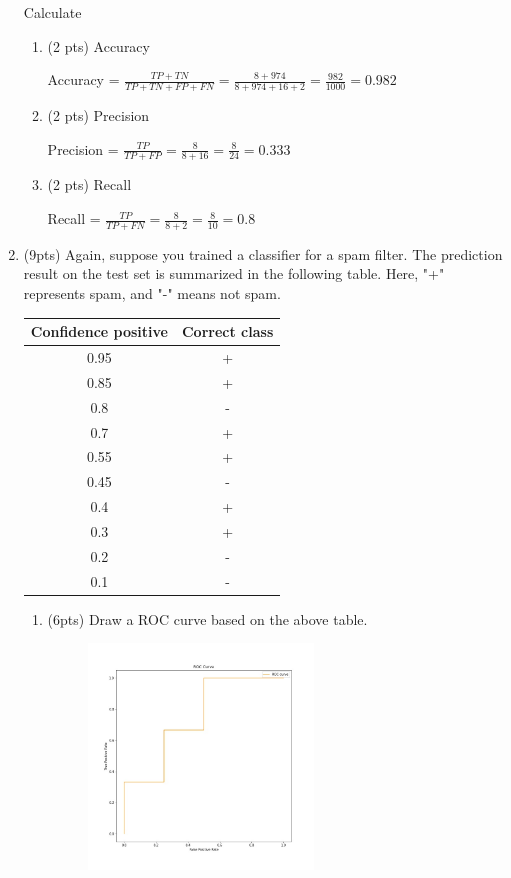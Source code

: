 \documentclass[a4paper]{article}
\theoremstyle{definition}
\newenvironment{soln}{
    \leavevmode\color{blue}\ignorespaces
}{}
\begin{document}
\begin{enumerate}
Calculate
\begin{enumerate}
	\item (2 pts) Accuracy
	\begin{soln} 
		Accuracy = $\frac{TP + TN}{TP + TN + FP + FN} = \frac{8 + 974}{8 + 974 + 16 + 2} = \frac{982}{1000} = 0.982$
	\end{soln}
	\item (2 pts) Precision
	\begin{soln} 
		Precision = $\frac{TP}{TP + FP} = \frac{8}{8 + 16} = \frac{8}{24} = 0.333$
	\end{soln}
	\item (2 pts) Recall
	\begin{soln}
		Recall = $\frac{TP}{TP + FN} = \frac{8}{8 + 2} = \frac{8}{10} = 0.8$
	\end{soln}
\end{enumerate}


\item (9pts) Again, suppose you trained a classifier for a spam filter. The prediction result on the test set is summarized in the following table. Here, "+" represents spam, and "-" means not spam.

\begin{center}
\begin{tabular}{ c  c }
\hline
Confidence positive & Correct class \\ \hline
0.95 & + \\
0.85 & + \\
0.8 & - \\
0.7 & + \\
0.55 & + \\
0.45 & - \\
0.4 & + \\
0.3 & + \\
0.2 & - \\
0.1 & - \\
\hline
\end{tabular}
\end{center}

\begin{enumerate}
	\item (6pts) Draw a ROC curve based on the above table.
	
	\begin{soln} 
		\begin{figure}[H]
			\centering
			\includegraphics[width=6cm]{q1q5.jpg}
		\end{figure}
	

\end{soln}
\end{enumerate}
\end{enumerate}
\end{document}
